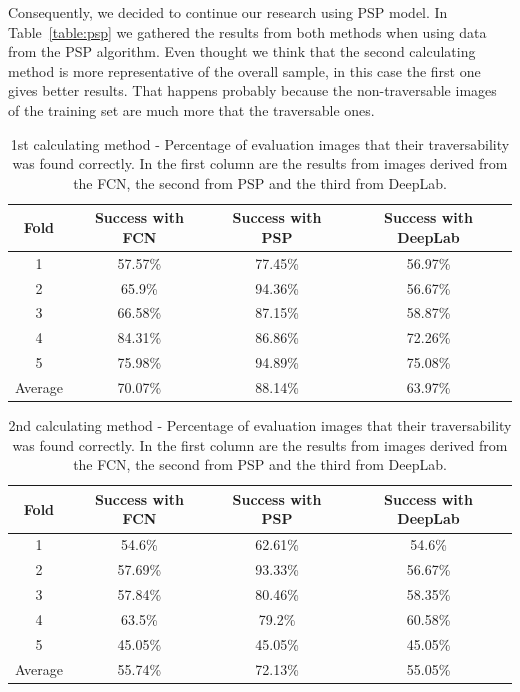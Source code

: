 \documentclass[12pt,a4paper]{report}
\newcommand{\acronym}{\MakeUppercase}
\begin{document}
	Consequently, we decided to continue our research using \acronym{psp} model. 
	In Table~\ref{table:psp} we gathered the results from both methods when using data 
	from the \acronym{psp} algorithm. Even thought we think that the second calculating 
	method is more representative of the overall sample, in this case the first one gives 
	better results. That happens probably because the non-traversable images of the 
	training set are much more that the traversable ones.
	\\
	
	\begin{table}[h!]
		\centering
		\begin{tabular}{|c|c|c|c|}
			\hline
			Fold & Success with \acronym{fcn} & Success with \acronym{psp} & Success with DeepLab\\ 
			\hline\hline
			1 & 57.57\% & 77.45\% & 56.97\%\\
			\hline
			2 & 65.9\% & 94.36\% & 56.67\%\\
			\hline
			3 & 66.58\% & 87.15\% & 58.87\%\\
			\hline
			4 & 84.31\% & 86.86\% & 72.26\%\\
			\hline
			5 & 75.98\% & 94.89\% & 75.08\%\\
			\hline\hline
			Average & 70.07\% & 88.14\% & 63.97\%\\
			\hline
		\end{tabular}
		\caption{1st calculating method - Percentage of evaluation images that their 
		traversability was found correctly. In the first column are the results from 
		images derived from the \acronym{fcn}, the second from \acronym{psp} and the 
		third from DeepLab.}
		\label{table:1st}
	\end{table}
	
	\begin{table}[h!]
		\centering
		\begin{tabular}{|c|c|c|c|}
			\hline
			Fold & Success with \acronym{fcn} & Success with \acronym{psp} & Success with DeepLab\\ 
			\hline\hline
			1 & 54.6\% & 62.61\% & 54.6\%\\
			\hline
			2 & 57.69\% & 93.33\% & 56.67\%\\
			\hline
			3 & 57.84\% & 80.46\% & 58.35\%\\
			\hline
			4 & 63.5\% & 79.2\% & 60.58\%\\
			\hline
			5 & 45.05\% & 45.05\% & 45.05\%\\
			\hline\hline
			Average & 55.74\% & 72.13\% & 55.05\%\\
			\hline
		\end{tabular}
		\caption{2nd calculating method - Percentage of evaluation images that their 
		traversability was found correctly. In the first column are the results from 
		images derived from the \acronym{fcn}, the second from \acronym{psp} and the 
		third from DeepLab.}
		\label{table:2nd}
	\end{table}
	
\end{document}
